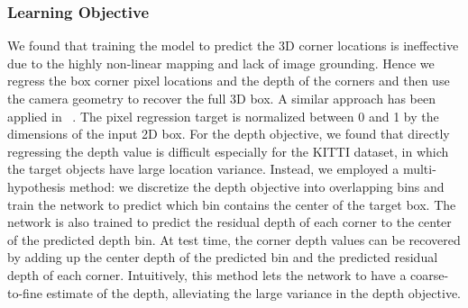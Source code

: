 \documentclass[10pt,twocolumn,letterpaper]{article}
\begin{document}
\subsubsection{Learning Objective} We found that training the model to predict the 3D corner locations is ineffective due to the highly non-linear mapping and lack of image grounding. Hence we regress the box corner pixel locations and the depth of the corners and then use the camera geometry to recover the full 3D box. A similar approach has been applied in ~\cite{mousavian20163d}. The pixel regression target is normalized between 0 and 1 by the dimensions of the input 2D box. For the depth objective, we found that directly regressing the depth value is difficult especially for the KITTI dataset, in which the target objects have large location variance. Instead, we employed a multi-hypothesis method: we discretize the depth objective into overlapping bins and train the network to predict which bin contains the center of the target box. The network is also trained to predict the residual depth of each corner to the center of the predicted depth bin. At test time, the corner depth values can be recovered by adding up the center depth of the predicted bin and the predicted residual depth of each corner. Intuitively, this method lets the network to have a coarse-to-fine estimate of the depth, alleviating the large variance in the depth objective.
\end{document}
